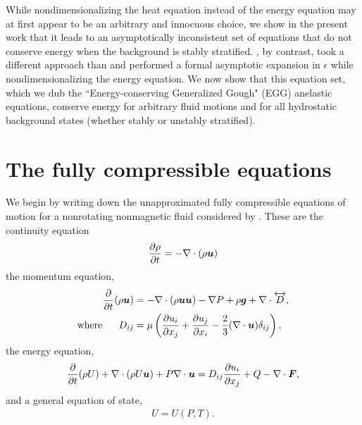 \documentclass[12pt]{article}
\newcommand{\vecf}{\bm{F}}
\begin{document}
	While nondimensionalizing the heat equation instead of the energy equation may at first appear to be an arbitrary and innocuous choice, we show in the present work that it leads to an asymptotically inconsistent set of equations that do not conserve energy when the background is stably stratified. \citet{Gough1969}, by contrast, took a different approach than \citet{Ogura1962} and performed a formal asymptotic expansion in $\epsilon$ while nondimensionalizing the energy equation. We now show that this equation set, which we dub the ``Energy-conserving Generalized Gough" (EGG) anelastic equations, conserve energy for arbitrary fluid motions and for all hydrostatic background states (whether stably or unstably stratified).
	
	\section{The fully compressible equations}
	We begin by writing down the unapproximated fully compressible equations of motion for a nonrotating nonmagnetic fluid considered by \citet{Gough1969}. These are the continuity equation 
	\begin{align}\label{eq:cont}
		\frac{\partial\rho}{\partial t}=-\nabla\cdot(\rho\bm{u}) 
	\end{align}
	the momentum equation,
	\begin{subequations}\label{eq:mom}
	\begin{align}
		\frac{\partial}{\partial t}(\rho\bm{u})&=-\nabla\cdot(\rho\bm{u}\bm{u}) - \nabla P +\rho\bm{g} +\nabla\cdot \overleftrightarrow{D},\label{eq:mommain}\\
		\text{where}\ \ \ \ \  D_{ij}& = \mu\left(\frac{\partial u_i}{\partial x_j} + \frac{\partial u_j}{\partial x_i} - \frac{2}{3}(\nabla\cdot\bm{u})\delta_{ij}\right),\label{eq:momvisc}
	\end{align}
	\end{subequations}
	the energy equation,
	\begin{align}\label{eq:en}
		\pderiv{}{t}(\rho U) + \Div(\rho U\vecu) + P\Div\vecu = D_{ij}\pderiv{u_i}{x_j} + Q - \Div\vecf,
	\end{align}
	and a general equation of state,
	\begin{align}\label{eq:eos}
		U = U(P,T).
	\end{align}
\end{document}
